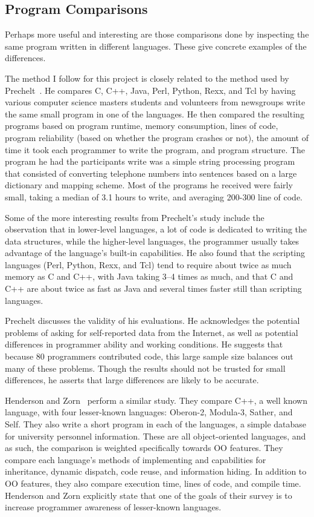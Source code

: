 \documentclass{article}
\begin{document}
\subsection{Program Comparisons}

Perhaps more useful and interesting are those comparisons done by inspecting
the same program written in different languages.  These give concrete examples
of the differences.

The method I follow for this project is closely related to the method used by
Prechelt~\cite{Prechelt7LangComp}.  He compares C, C++, Java, Perl, Python,
Rexx, and Tcl by having various computer science masters students and
volunteers from newsgroups write the same small program in one of the
languages.  He then compared the resulting programs based on program runtime,
memory consumption, lines of code, program reliability (based on whether the
program crashes or not), the amount of time it took each programmer to write
the program, and program structure.  The program he had the participants write
was a simple string processing program that consisted of converting telephone
numbers into sentences based on a large dictionary and mapping scheme.  Most of
the programs he received were fairly small, taking a median of 3.1 hours to
write, and averaging 200-300 line of code.

Some of the more interesting results from Prechelt's study include the
observation that in lower-level languages, a lot of code is dedicated to
writing the data structures, while the higher-level languages, the programmer
usually takes advantage of the language's built-in capabilities.  He also found
that the scripting languages (Perl, Python, Rexx, and Tcl) tend to require
about twice as much memory as C and C++, with Java taking 3--4 times as much,
and that C and C++ are about twice as fast as Java and several times faster
still than scripting languages.

Prechelt discusses the validity of his evaluations.  He acknowledges the
potential problems of asking for self-reported data from the Internet, as well
as potential differences in programmer ability and working conditions.  He
suggests that because 80 programmers contributed code, this large sample size
balances out many of these problems.  Though the results should not be trusted
for small differences, he asserts that large differences are likely to be
accurate.

Henderson and Zorn~\cite{Henderson4OOLangComp} perform a similar study.  They
compare C++, a well known language, with four lesser-known languages: Oberon-2,
Modula-3, Sather, and Self.  They also write a short program in each of the
languages, a simple database for university personnel information.  These are
all object-oriented languages, and as such, the comparison is weighted
specifically towards OO features.  They compare each language's methods of
implementing and capabilities for inheritance, dynamic dispatch, code reuse,
and information hiding.  In addition to OO features, they also compare
execution time, lines of code, and compile time.  Henderson and Zorn explicitly
state that one of the goals of their survey is to increase programmer awareness
of lesser-known languages.
\end{document}
